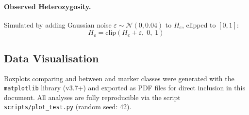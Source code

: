 \paragraph{Observed Heterozygosity.}
Simulated by adding Gaussian noise $\varepsilon \sim \mathcal{N}(0, 0.04)$
to $H_e$, clipped to $[0, 1]$:
\begin{equation}
    H_o = \text{clip}\left(H_e + \varepsilon,\; 0,\; 1\right)
    \label{eq:ho}
\end{equation}

\subsection{Data Visualisation}
\label{sec:viz}

Boxplots comparing \pic{} and \he{} between \snp{} and \ssr{} marker
classes were generated with the \texttt{matplotlib} library (v3.7+) and
exported as PDF files for direct inclusion in this document. All analyses
are fully reproducible via the script \texttt{scripts/plot\_test.py}
(random seed: 42).
